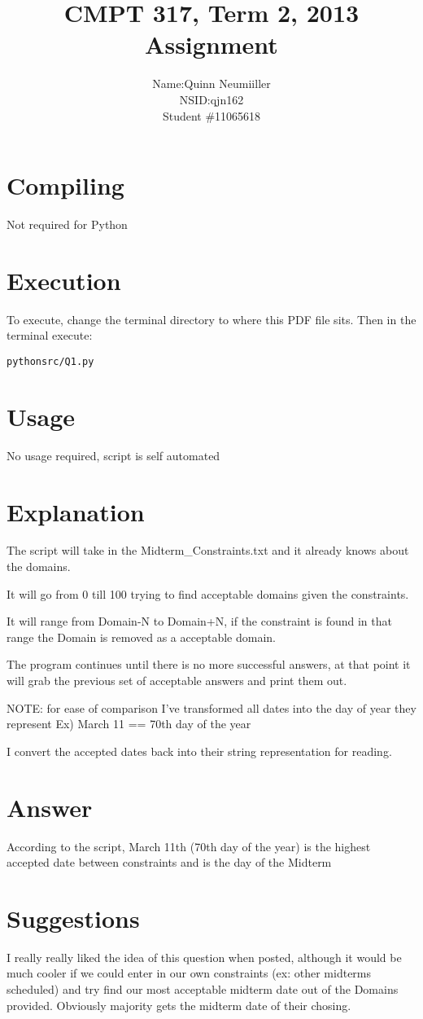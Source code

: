 \documentclass{article}
\title{CMPT 317, Term 2, 2013\\
Assignment \AssignmentNum\\
\AssignmentTitle
}
\author{
	\begin{tabular}{ l r }
	  Name: & Quinn Neumiiller \\
	  NSID: & qjn162 \\
	  Student \# & 11065618 \\
	\end{tabular}
}
\date{\AssignmentDate}
\newcommand{\QuestionNum}{1}
\begin{document}
   \maketitle
   
   \section{Compiling}
   Not required for Python

   \section{Execution}
   To execute, change the terminal directory to where this PDF file sits.
   Then in the terminal execute:
	\begin{alltt}
	python src/Q\QuestionNum.py
	\end{alltt}

  \section{Usage}
    No usage required, script is self automated
  \section{Explanation}
    The script will take in the Midterm\_Constraints.txt and it already knows about the domains.

    It will go from 0 till 100 trying to find acceptable domains given the constraints.

    It will range from Domain-N to Domain+N, if the constraint is found in that range the
    Domain is removed as a acceptable domain.

    The program continues until there is no more successful answers, at that point it will grab the previous
    set of acceptable answers and print them out.

    NOTE: for ease of comparison I've transformed all dates into the day of year they represent
    Ex) March 11 == 70th day of the year

    I convert the accepted dates back into their string representation for reading.
  \section{Answer}
    According to the script, March 11th (70th day of the year) is the highest accepted 
    date between constraints and is the day of the Midterm

  \section{Suggestions}
    I really really liked the idea of this question when posted, although it would be much cooler
    if we could enter in our own constraints (ex: other midterms scheduled) and try find our most
    acceptable midterm date out of the Domains provided. Obviously majority gets the midterm date of their chosing.
\end{document}
